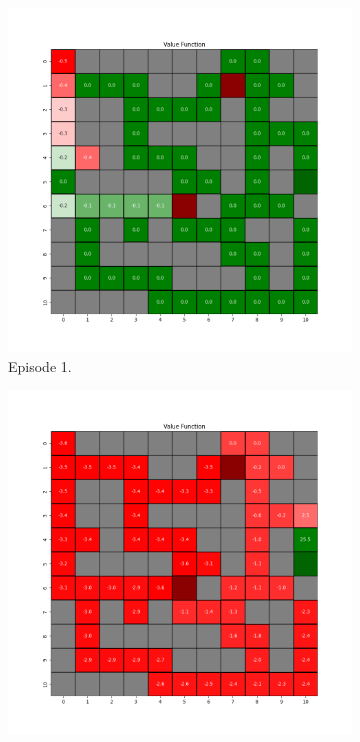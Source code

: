 \documentclass{assignment}
\begin{document}
\begin{figure}[H]
    \begin{subfigure}{0.3\textwidth}
        \includegraphics[width=\textwidth]{figures/value_q/gamma_sweep/value_function_alpha_0.1_gamma_0.75_epsilon_0.2_iteration_1.png}
    \caption{Episode 1.}
    \end{subfigure}\hfill
    \begin{subfigure}{0.3\textwidth}
        \includegraphics[width=\textwidth]{figures/value_q/gamma_sweep/value_function_alpha_0.1_gamma_0.75_epsilon_0.2_iteration_50.png}

\end{subfigure}
\end{figure}
\end{document}
